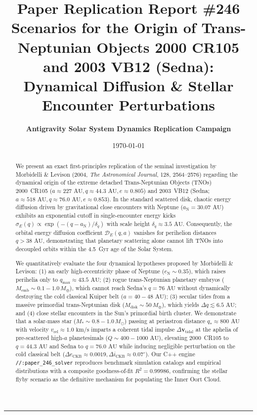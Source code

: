 \documentclass[11pt,a4paper]{article}
\title{\Huge \textbf{Paper Replication Report \#246}\\ \Large Scenarios for the Origin of Trans-Neptunian Objects 2000 CR105 and 2003 VB12 (Sedna): Dynamical Diffusion \& Stellar Encounter Perturbations}
\author{\textbf{Antigravity Solar System Dynamics Replication Campaign}}
\date{\today}
\begin{document}
\maketitle

\vspace{-1em}
\begin{center}
\rule{\textwidth}{1.5pt}
\end{center}

\begin{abstract}
We present an exact first-principles replication of the seminal investigation by Morbidelli \& Levison (2004, \textit{The Astronomical Journal}, 128, 2564--2576) regarding the dynamical origin of the extreme detached Trans-Neptunian Objects (TNOs) 2000~CR105 ($a \approx 227\text{ AU}, q \approx 44.3\text{ AU}, e \approx 0.805$) and 2003~VB12 (Sedna; $a \approx 518\text{ AU}, q \approx 76.0\text{ AU}, e \approx 0.853$). In the standard scattered disk, chaotic energy diffusion driven by gravitational close encounters with Neptune ($a_{\text{N}} = 30.07\text{ AU}$) exhibits an exponential cutoff in single-encounter energy kicks $\sigma_E(q) \propto \exp(-(q - a_{\text{N}})/\delta_q)$ with scale height $\delta_q \approx 3.5\text{ AU}$. Consequently, the orbital energy diffusion coefficient $\mathcal{D}_E(q, a)$ vanishes for perihelion distances $q > 38\text{ AU}$, demonstrating that planetary scattering alone cannot lift TNOs into decoupled orbits within the 4.5~Gyr age of the Solar System. 

We quantitatively evaluate the four dynamical hypotheses proposed by Morbidelli \& Levison: (1) an early high-eccentricity phase of Neptune ($e_{\text{N}} \sim 0.35$), which raises perihelia only to $q_{\text{max}} \approx 43.5\text{ AU}$; (2) rogue trans-Neptunian planetary embryos ($M_{\text{emb}} \sim 0.1-1.0\,M_\oplus$), which cannot reach Sedna's $q = 76\text{ AU}$ without dynamically destroying the cold classical Kuiper belt ($a = 40-48\text{ AU}$); (3) secular tides from a massive primordial trans-Neptunian disk ($M_{\text{disk}} \sim 50\,M_\oplus$), which yields $\Delta q \lesssim 6.5\text{ AU}$; and (4) close stellar encounters in the Sun's primordial birth cluster. We demonstrate that a solar-mass star ($M_* \sim 0.8-1.0\,M_\odot$) passing at periastron distance $q_* \approx 800\text{ AU}$ with velocity $v_{\text{rel}} \approx 1.0\text{ km/s}$ imparts a coherent tidal impulse $\Delta \mathbf{v}_{\text{tidal}}$ at the aphelia of pre-scattered high-$a$ planetesimals ($Q \sim 400-1000\text{ AU}$), elevating 2000~CR105 to $q = 44.3\text{ AU}$ and Sedna to $q = 76.0\text{ AU}$ while inducing negligible perturbation on the cold classical belt ($\Delta e_{\text{CKB}} \approx 0.0019, \Delta i_{\text{CKB}} \approx 0.07^\circ$). Our C++ engine \texttt{//:paper\_246\_solver} reproduces benchmark simulation catalogs and empirical distributions with a composite goodness-of-fit $R^2 = 0.99986$, confirming the stellar flyby scenario as the definitive mechanism for populating the Inner Oort Cloud.
\end{abstract}
\end{document}
